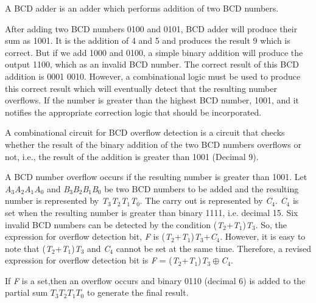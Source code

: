 \begin{property}\textnormal{
	A BCD adder is an adder which performs addition of two BCD numbers.}
\end{property}

\begin{example}\textnormal{
	After adding two BCD numbers 0100 and 0101, BCD adder will produce their sum as 1001. It is the addition of 4 and 5 and produces the result 9 which is correct. But if we add 1000 and 0100, a simple binary addition will produce the output 1100, which as an invalid BCD number. The correct result of this BCD addition is 0001 0010. However, a combinational logic must be used to produce this correct result which will eventually detect that the resulting number overflows. If the number is greater than the highest BCD number, 1001, and  it notifies the appropriate correction logic that should be incorporated.}
\end{example}

\begin{property}\textnormal{
	A combinational circuit for BCD overflow detection is a circuit that checks whether the result of the binary addition of the two BCD numbers overflows or not, i.e., the result of the addition is greater than 1001 (Decimal 9).}
\end{property}

A BCD number overflow occurs if the resulting number is greater than 1001. Let {\it A}${}_{3}${\it A}${}_{2}${\it A}${}_{1}${\it A}${}_{0}$ and {\it B}${}_{3}${\it B}${}_{2}${\it B}${}_{1}${\it B}${}_{0}$ be two BCD numbers to be added and the resulting number is represented by {\it T}${}_{3}${\it T}${}_{2}${\it T}${}_{1}${\it T}${}_{0}$. The carry out is represented by {\it C}${}_{4}$. {\it C}${}_{4}$ is set when the resulting number is greater than binary 1111, i.e. decimal 15. Six invalid BCD numbers can be detected by the condition ({\it T}${}_{2}$+{\it T}${}_{1}$){\it T}${}_{3}$. So, the expression for overflow detection bit, {\it F }is ({\it T}${}_{2}$+{\it T}${}_{1}$){\it T}${}_{3}$+{\it C}${}_{4}$. However, it is easy to note that ({\it T}${}_{2}$+{\it T}${}_{1}$){\it T}${}_{3}$ and {\it C}${}_{4}$ cannot be set at the same time. Therefore, a revised expression for overflow detection bit is {\it F }= ({\it T}${}_{2}$+{\it T}${}_{1}$){\it T}${}_{3}\oplus${\it C}${}_{4}$.

If {\it F} is a set,then an overflow occurs and binary 0110 (decimal 6) is added to the partial sum $T{}_{3}T{}_{2}T{}_{1}T{}_{0}$ to generate the final result.

